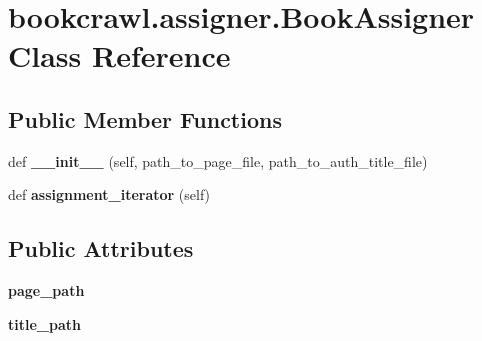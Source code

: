 \hypertarget{classbookcrawl_1_1assigner_1_1BookAssigner}{}\section{bookcrawl.\+assigner.\+Book\+Assigner Class Reference}
\label{classbookcrawl_1_1assigner_1_1BookAssigner}
\subsection*{Public Member Functions}
\begin{DoxyCompactItemize}
\item 
\hypertarget{classbookcrawl_1_1assigner_1_1BookAssigner_aa6bd54e63fb081f00f9d2e198cf51d96}{}def {\bfseries \+\_\+\+\_\+init\+\_\+\+\_\+} (self, path\+\_\+to\+\_\+page\+\_\+file, path\+\_\+to\+\_\+auth\+\_\+title\+\_\+file)\label{classbookcrawl_1_1assigner_1_1BookAssigner_aa6bd54e63fb081f00f9d2e198cf51d96}

\item 
\hypertarget{classbookcrawl_1_1assigner_1_1BookAssigner_a5043dcb507d28c5e1765e59cdca8e77d}{}def {\bfseries assignment\+\_\+iterator} (self)\label{classbookcrawl_1_1assigner_1_1BookAssigner_a5043dcb507d28c5e1765e59cdca8e77d}

\end{DoxyCompactItemize}
\subsection*{Public Attributes}
\begin{DoxyCompactItemize}
\item 
\hypertarget{classbookcrawl_1_1assigner_1_1BookAssigner_a0894529393c51c49ec698f308f75a241}{}{\bfseries page\+\_\+path}\label{classbookcrawl_1_1assigner_1_1BookAssigner_a0894529393c51c49ec698f308f75a241}

\item 
\hypertarget{classbookcrawl_1_1assigner_1_1BookAssigner_a680a55018bf04f6a99f5e5b7ee53d591}{}{\bfseries title\+\_\+path}\label{classbookcrawl_1_1assigner_1_1BookAssigner_a680a55018bf04f6a99f5e5b7ee53d591}

\end{DoxyCompactItemize}
